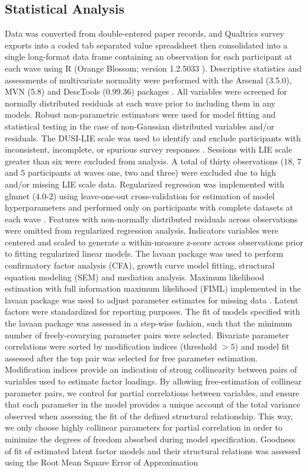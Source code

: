 \documentclass[utf8]{article}
\begin{document}
\subsection{Statistical Analysis}
Data was converted from double-entered paper records, and Qualtrics survey exports into a coded tab separated value spreadsheet then consolidated into a single long-format data frame containing an observation for each participant at each wave using R (Orange Blossom; version 1.2.5033 \cite{R}). Descriptive statistics and assessments of multivariate normality were performed with the Arsenal (3.5.0), MVN (5.8) and DescTools (0.99.36) packages \citep{MVN,DescTools}. All variables were screened for normally distributed residuals at each wave prior to including them in any models. Robust non-parametric estimators were used for model fitting and statistical testing in the case of non-Gaussian distributed variables and/or residuals. The DUSI-LIE scale was used to identify and exclude participants with inconsistent, incomplete, or spurious survey responses \citep{dalla2003effects}. Sessions with LIE scale greater than six were excluded from analysis. A total of thirty observations ($18$, $7$ and $5$ participants at waves one, two and three) were excluded due to high and/or missing LIE scale data. Regularized regression was implemented with glmnet (4.0-2) using leave-one-out cross-validation for estimation of model hyperparameters and performed only on participants with complete datasets at each wave \citep{friedman2009glmnet, FriedmanHastieTibshirani2010}. Features with non-normally distributed residuals across observations were omitted from regularized regression analysis. Indicators variables were centered and scaled to generate a within-measure z-score across observations prior to fitting regularized linear models. The lavaan package was used to perform confirmatory factor analysis (CFA), growth curve model fitting, structural equation modeling (SEM) and mediation analysis. Maximum likelihood estimation with full information maximum likelihood (FIML) implemented in the lavaan package was used to adjust parameter estimates for missing data \citep{cham2017full}. Latent factors were standardized for reporting purposes. The fit of models specified with the lavaan package was assessed in a step-wise fashion, such that the minimum number of freely-covarying parameter pairs were selected. Bivariate parameter correlations were sorted by modification indices (threshold $>5$) and model fit assessed after the top pair was selected for free parameter estimation. Modification indices provide an indication of strong collinearity between pairs of variables used to estimate factor loadings. By allowing free-estimation of collinear parameter pairs, we control for partial correlations between variables, and ensure that each parameter in the model provides a unique account of the total variance observed when assessing the fit of the defined structural relationship. This way, we only choose highly collinear parameters for partial correlation in order to minimize the degrees of freedom absorbed during model specification. Goodness of fit of estimated latent factor models and their structural relations was assessed using the Root Mean Square Error of Approximation 
\end{document}
